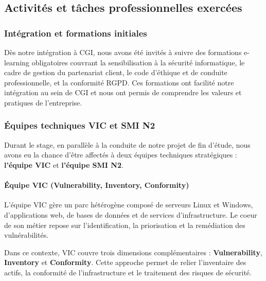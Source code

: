\subsection{Activités et tâches professionnelles exercées}

\subsubsection{Intégration et formations initiales}
Dès notre intégration à CGI, nous avons été invités à suivre des formations e-learning obligatoires couvrant la sensibilisation à la sécurité informatique, le cadre de gestion du partenariat client, le code d'éthique et de conduite professionnelle, et la conformité RGPD. Ces formations ont facilité notre intégration au sein de CGI et nous ont permis de comprendre les valeurs et pratiques de l'entreprise.

\subsubsection{Équipes techniques VIC et SMI N2}
Durant le stage, en parallèle à la conduite de notre projet de fin d'étude, nous avons eu la chance d'être affectés à deux équipes techniques stratégiques : \textbf{l'équipe VIC} et \textbf{l'équipe SMI N2}.

\paragraph{Équipe VIC (Vulnerability, Inventory, Conformity)}
L'équipe VIC gère un parc hétérogène composé de serveurs Linux et Windows, d'applications web, de bases de données et de services d'infrastructure. Le coeur de son métier repose sur l'identification, la priorisation et la remédiation des vulnérabilités.

Dans ce contexte, VIC couvre trois dimensions complémentaires : \textbf{Vulnerability}, \textbf{Inventory} et \textbf{Conformity}. Cette approche permet de relier l'inventaire des actifs, la conformité de l'infrastructure et le traitement des risques de sécurité.

